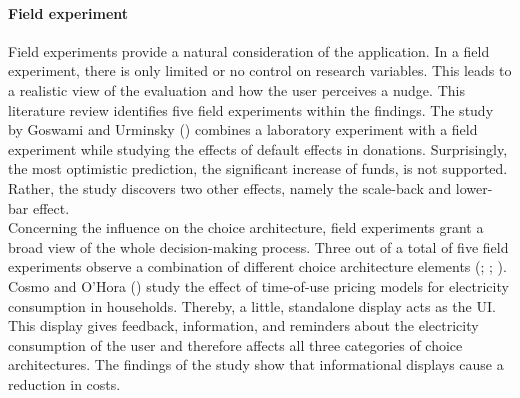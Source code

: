 \paragraph{Field experiment}
Field experiments provide a natural consideration of the application. In a field experiment, there is only limited or no control on research variables. This leads to a realistic view of the evaluation and how the user perceives a nudge. This literature review identifies five field experiments within the findings. The study by Goswami and Urminsky (\citeyear{goswami_when_2016}) combines a laboratory experiment with a field experiment while studying the effects of default effects in donations. Surprisingly, the most optimistic prediction, the significant increase of funds, is not supported. Rather, the study discovers two other effects, namely the scale-back and lower-bar effect.
\\
 
Concerning the influence on the choice architecture, field experiments grant a broad view of the whole decision-making process. Three out of a total of five field experiments observe a combination of different choice architecture elements (\cite{miller_effects_2016}; \cite{cosmo_nudging_2017}; \cite{mazar_if_2018}). Cosmo and O'Hora (\citeyear{cosmo_nudging_2017}) study the effect of time-of-use pricing models for electricity consumption in households. Thereby, a little, standalone display acts as the UI. This display gives feedback, information, and reminders about the electricity consumption of the user and therefore affects all three categories of choice architectures. The findings of the study show that informational displays cause a reduction in costs.

